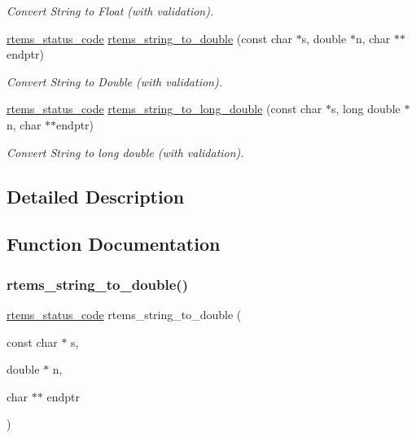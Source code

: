 \begin{DoxyCompactItemize}
\begin{DoxyCompactList}\small\item\em Convert String to Float (with validation). \end{DoxyCompactList}\item 
\mbox{\hyperlink{group__ClassicStatus_ga545d41846817eaba6143d52ee4d9e9fe}{rtems\+\_\+status\+\_\+code}} \mbox{\hyperlink{group__libmisc__conv__help_ga1665d58ae1e953e503c15d32abdf4c7e}{rtems\+\_\+string\+\_\+to\+\_\+double}} (const char $\ast$s, double $\ast$n, char $\ast$$\ast$endptr)
\begin{DoxyCompactList}\small\item\em Convert String to Double (with validation). \end{DoxyCompactList}\item 
\mbox{\hyperlink{group__ClassicStatus_ga545d41846817eaba6143d52ee4d9e9fe}{rtems\+\_\+status\+\_\+code}} \mbox{\hyperlink{group__libmisc__conv__help_ga37116e88b7467da5efb51f9474b17d90}{rtems\+\_\+string\+\_\+to\+\_\+long\+\_\+double}} (const char $\ast$s, long double $\ast$n, char $\ast$$\ast$endptr)
\begin{DoxyCompactList}\small\item\em Convert String to long double (with validation). \end{DoxyCompactList}\end{DoxyCompactItemize}


\subsection{Detailed Description}


\subsection{Function Documentation}
\mbox{\label{group__libmisc__conv__help_ga1665d58ae1e953e503c15d32abdf4c7e}} 
\subsubsection{\texorpdfstring{rtems\_string\_to\_double()}{rtems\_string\_to\_double()}}
{\footnotesize\ttfamily \mbox{\hyperlink{group__ClassicStatus_ga545d41846817eaba6143d52ee4d9e9fe}{rtems\+\_\+status\+\_\+code}} rtems\+\_\+string\+\_\+to\+\_\+double (\begin{DoxyParamCaption}\item[{const char $\ast$}]{s,  }\item[{double $\ast$}]{n,  }\item[{char $\ast$$\ast$}]{endptr }\end{DoxyParamCaption})}




